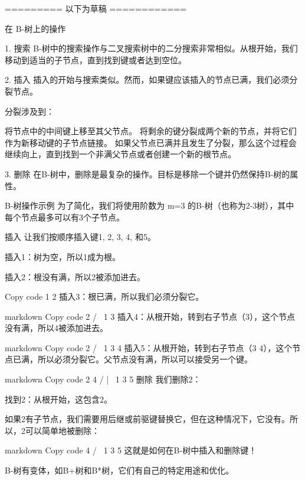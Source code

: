 ========= 以下为草稿 ============


在 B-树上的操作

1. 搜索
B-树中的搜索操作与二叉搜索树中的二分搜索非常相似。从根开始，我们移动到适当的子节点，直到找到键或者达到空位。

2. 插入
插入的开始与搜索类似。然而，如果键应该插入的节点已满，我们必须分裂节点。

分裂涉及到：

将节点中的中间键上移至其父节点。
将剩余的键分裂成两个新的节点，并将它们作为新移动键的子节点链接。
如果父节点已满并且发生了分裂，那么这个过程会继续向上，直到找到一个非满父节点或者创建一个新的根节点。

3. 删除
在B-树中，删除是最复杂的操作。目标是移除一个键并仍然保持B-树的属性。

B-树操作示例
为了简化，我们将使用阶数为 m=3 的B-树（也称为2-3树），其中每个节点最多可以有3个子节点。

插入
让我们按顺序插入键1, 2, 3, 4, 和5。

插入1：树为空，所以1成为根。

插入2：根没有满，所以2被添加进去。

Copy code
 1 2
插入3：根已满，所以我们必须分裂它。

markdown
Copy code
     2
   /   \
 1       3
插入4：从根开始，转到右子节点（3），这个节点没有满，所以4被添加进去。

markdown
Copy code
     2
   /   \
 1      3 4
插入5：从根开始，转到右子节点（3 4），这个节点已满，所以必须分裂它。父节点没有满，所以可以接受另一个键。

markdown
Copy code
     2 4
   /   |   \
 1      3    5
删除
我们删除2：

找到2：从根开始，这包含2。

如果2有子节点，我们需要用后继或前驱键替换它，但在这种情况下，它没有。所以，2可以简单地被删除：

markdown
Copy code
     4
   /   \
 1      3 5
这就是如何在B-树中插入和删除键！


B-树有变体，如B+树和B*树，它们有自己的特定用途和优化。